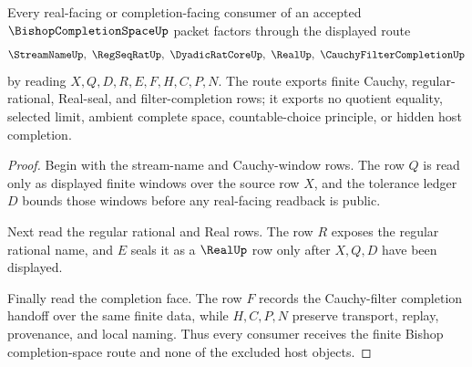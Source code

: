 \begin{theorem}
\label{thm:bishop-completion-space-real-route}
Every real-facing or completion-facing consumer of an accepted $\BishopCompletionSpaceUp$ packet factors through the displayed route
$$
\StreamNameUp,\ \RegSeqRatUp,\ \DyadicRatCoreUp,\ \RealUp,\ \CauchyFilterCompletionUp
$$
by reading $X,Q,D,R,E,F,H,C,P,N$. The route exports finite Cauchy, regular-rational, Real-seal, and filter-completion rows; it exports no quotient equality, selected limit, ambient complete space, countable-choice principle, or hidden host completion.
\end{theorem}
\begin{proof}
Begin with the stream-name and Cauchy-window rows. The row $Q$ is read only as displayed finite windows over the source row $X$, and the tolerance ledger $D$ bounds those windows before any real-facing readback is public.

Next read the regular rational and Real rows. The row $R$ exposes the regular rational name, and $E$ seals it as a $\RealUp$ row only after $X,Q,D$ have been displayed.

Finally read the completion face. The row $F$ records the Cauchy-filter completion handoff over the same finite data, while $H,C,P,N$ preserve transport, replay, provenance, and local naming. Thus every consumer receives the finite Bishop completion-space route and none of the excluded host objects.
\end{proof}




